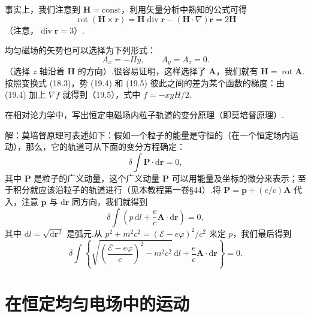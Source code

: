 事实上，我们注意到 $\boldsymbol{H}=\mathrm{const}$，利用矢量分析中熟知的公式可得
\begin{equation*}
  \operatorname{rot}\left(\boldsymbol{H}\times\boldsymbol{r}\right)
  =\boldsymbol{H}\operatorname{div}\boldsymbol{r}
  -\left(\boldsymbol{H}\cdot\nabla\right)\boldsymbol{r}
  =2\boldsymbol{H}
\end{equation*}
（注意，$\operatorname{div}\boldsymbol{r}=3$）.

均匀磁场的矢势也可以选择为下列形式：
\begin{equation}
  A_x=-Hy,\qquad A_y=A_z=0.
\end{equation}
（选择 $z$ 轴沿着 $\boldsymbol{H}$ 的方向）.很容易证明，这样选择了 $\boldsymbol{A}$，我们就有
$\boldsymbol{H}=\operatorname{rot}\boldsymbol{A}$.按照变换式 (18.3)，势 (19.4) 和 (19.5)
彼此之间的差为某个函数的梯度：由 (19.4) 加上 $\nabla f$ 就得到（19.5），式中 $f=-xyH/2$.

\begin{xiti}

\quad 在相对论力学中，写出恒定电磁场内粒子轨道的变分原理（即莫培督原理）.

解：莫培督原理可表述如下：假如一个粒子的能量是守恒的（在一个恒定场内运动），那么，它的轨道可从下面的变分方程确定：
\begin{equation*}
  \delta\int\boldsymbol{P}\cdot\mathrm{d}\boldsymbol{r}=0,
\end{equation*}
其中 $\boldsymbol{P}$ 是粒子的广义动量，这个广义动量 $\boldsymbol{P}$ 可以用能量及坐标的微分来表示；至于积分就应该沿粒子的轨道进行（见本教程第一卷§44）.将
$\boldsymbol{P}=\boldsymbol{p}+(e/c)\boldsymbol{A}$ 代入，注意 $\boldsymbol{p}$ 与
$\mathrm{d}\boldsymbol{r}$ 同方向，我们就得到
\begin{equation*}
  \delta\int\left(p\,\mathrm{d}l+\frac{e}{c}\boldsymbol{A}\cdot\mathrm{d}\boldsymbol{r}\right)=0,
\end{equation*}
其中 $\mathrm{d}l=\sqrt{\mathrm{d}\boldsymbol{r}^2}$ 是弧元.从
$p^2+m^2c^2=(\mathcal{E}-e\varphi)^2/c^2$ 来定 $p$，我们最后得到
\begin{equation*}
  \delta\int\left\{\sqrt{\left(\frac{\mathcal{E}-e\varphi}{c}\right)^2-m^2c^2}\,\mathrm{d}l
  +\frac{e}{c}\boldsymbol{A}\cdot\mathrm{d}\boldsymbol{r}\right\}=0.
\end{equation*}

\end{xiti}

\section{在恒定均匀电场中的运动}

